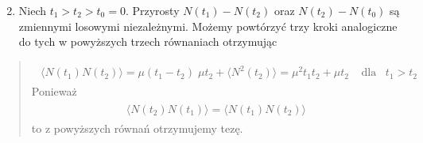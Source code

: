 \documentclass[a4paper,12pt,polish]{sphinxmanual}
\begin{document}
\begin{enumerate}
\setcounter{enumi}{1}
\item {} 
Niech $t_1 > t_2 > t_0=0$. Przyrosty $N(t_1) - N(t_2)$ oraz $N(t_2) - N(t_0)$ są zmiennymi losowymi niezależnymi. Możemy powtórzyć trzy kroki analogiczne do tych w powyższych trzech równaniach otrzymując

\end{enumerate}
\begin{quote}
\label{ch3/chIII021:equation-eqn39}\begin{gather}
\begin{split}\langle N(t_1) N(t_2)\rangle = \mu (t_1 -t_2) \; \mu t_2 + \langle N^2(t_2)\rangle = \mu^2 t_1 t_2 + \mu t_2\; \; \; \; \mbox{dla} \; \; \; t_1 > t_2\end{split}\label{ch3/chIII021-eqn39}
\end{gather}
Ponieważ
\label{ch3/chIII021:equation-eqn40}\begin{gather}
\begin{split}\langle N(t_2) N(t_1)\rangle = \langle N(t_1) N(t_2)\rangle\end{split}\label{ch3/chIII021-eqn40}
\end{gather}
to z powyższych równań otrzymujemy tezę.
\end{quote}
\end{document}
